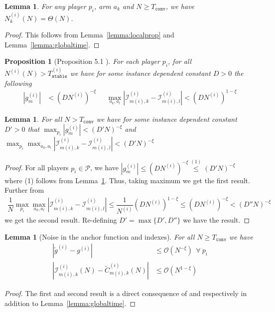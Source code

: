 \documentclass{article}
\newtheorem{proposition}[theorem]{Proposition}
\newtheorem{lemma}[theorem]{Lemma}
\begin{document}
\begin{lemma}
    For any player $p_i$, arm $a_k$ and $N\geq T_{\texttt{conv}}$, we have $N^{(i)}_k(N) = \Theta(N)$. 
    \label{lemma:linearN}
\end{lemma}
\begin{proof}
    This follows from Lemma~\ref{lemma:localprop} and Lemma~\ref{lemma:globaltime}.
\end{proof}
\begin{proposition}[Proposition 5.1\cite{bandyopadhyay2024optimal} ]\label{thm:local_convergence}
    For each player $p_i$,  for all $N^{(i)}(N)>T_{\texttt{stable}}^{(i)}$ we have for some instance dependent constant $D>0$ the following
    \begin{align*}
        |g^{(i)}_{m}|&<(DN^{(i)})^{-\xi}\ \quad\ 
        \max_{a_k,a_l}|\mathcal{I}^{(i)}_{m(i),k}-\mathcal{I}^{(i)}_{m(i),l}|<(DN^{(i)})^{1-\xi}
    \end{align*}
\end{proposition}

\begin{lemma}
   For all $N>T_{\texttt{conv}}$ we have for some instance dependent constant $D'>0$ that $\max_{p_i} |g^{(i)}_{m}|<(D'N)^{-\xi}$ and $ \max_{p_i}\max_{a_k,a_l}|\mathcal{I}^{(i)}_{m(i),k}-\mathcal{I}^{(i)}_{m(i),l}|<(D'N)^{-\xi}$
   \label{lemma:firstorderpi}
\end{lemma}
\begin{proof}
For all players $p_i\in \mathcal{P}$, we have $|g^{(i)}_{m}|\leq (DN^{(i)})^{-\xi} \overset{(1)}{\leq} (D'N)^{-\xi}$ 
    where (1) follows from Lemma~\ref{lemma:linearN}. 
    Thus, taking maximum we get the first result. Further from 
    \begin{align*}
         \dfrac{1}{N}\max_{p_i}\max_{a_k,a_l}|\mathcal{I}^{(i)}_{m(i),k}-\mathcal{I}^{(i)}_{m(i),l}|\leq \dfrac{1}{N^{(i)}}(DN^{(i)})^{1-\xi}\leq (DN^{(i)})^{-\xi}<(D''N)^{-\xi}
    \end{align*}
    we get the second result. Re-defining $D'=\max\{D',D''\}$ we have the result.
\end{proof}
\begin{lemma}[Noise in the anchor function and indexes]
    For all $N\geq T_{\texttt{conv}}$ we have
      \begin{align*}
      |\tilde{g}^{(i)}-g^{(i)}|&\leq  \mathcal{O}(N^{-\xi})\ \ \forall \ p_i\\
        |\mathcal{I}^{(i)}_{m(i),k}(N)-\tilde{C}^{(i)}_{m(i),k}(N)|&\leq  \mathcal{O}(N^{1-\xi})
    \end{align*}
    \label{lemma:noise}
\end{lemma}
\begin{proof}
    The first and second result is a direct consequence of \cite[Lemma G.1.]{bandyopadhyay2024optimal} and \cite[Lemma G.3.]{bandyopadhyay2024optimal} respectively in addition to Lemma~\ref{lemma:globaltime}.
\end{proof}
\end{document}
